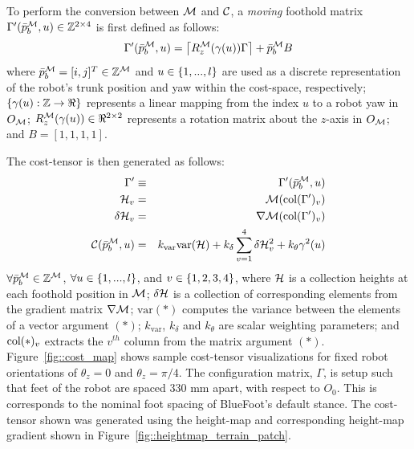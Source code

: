 			To perform the conversion between ${\cal M}$ and ${\cal C}$, a \emph{moving} foothold matrix $\Gamma'(\bar{p}^{{\cal M}}_{b},u) \in {\Bbb Z}^{2\times4}$ is first defined as follows:
				\begin{equation}
					\Gamma'(\bar{p}^{{\cal M}}_{b},u) = \left\lceil R_{z}^{{\cal M}}(\gamma(u))\Gamma \right\rceil + \bar{p}^{{\cal M}}_{b} B \\
					\label{eq::rel_feet}
				\end{equation}
			where  $\bar{p}^{{\cal M}}_{b} = [i,j]^T\in{\Bbb Z}^{{\cal M}}$ and $u \in \left\{1,...,l\right\}$ are used as a discrete representation of the robot's trunk position and yaw within the cost-space, respectively; $\left\{\gamma(u) : {\Bbb Z} \rightarrow \Re \right\}$ represents a linear mapping from the index $u$ to a robot yaw in $O_{{\cal M}}$; $R_{z}^{{\cal M}}(\gamma(u))\in\Re^{2\times2}$ represents a rotation matrix about the $z$-axis in $O_{{\cal M}}$; and $B = [1,1,1,1]$. 

			The cost-tensor is then generated as follows:
				\begin{eqnarray}
					\Gamma'	 				&\equiv& \Gamma'(\bar{p}^{{\cal M}}_{b},u) \nonumber \\
					{\cal H}_{v} 			&=& {\cal M}(\text{col}(\Gamma')_{v})	 \nonumber\\
					\delta {\cal H}_{v} 	&=& \nabla {\cal M}(\text{col}(\Gamma')_{v}) \nonumber\\
					{\cal C}(\bar{p}^{{\cal M}}_{b},u) 		&=& k_{\text{var}} \text{var}({\cal H}) + k_{\delta}\sum_{v=1}^{4} \delta {\cal H}_{v}^{2} + k_{\theta} \gamma^{2}(u) 
				\end{eqnarray}
			$\forall \bar{p}^{{\cal M}}_{b} \in \mathbb{Z}^{{\cal M}}$, $\forall u \in \left\{1,...,l\right\}$, and  $v \in \left\{1,2,3,4\right\}$, where ${\cal H}$ is a collection heights at each foothold position in ${\cal M}$; $\delta{\cal H}$ is a collection of corresponding elements from the gradient matrix $\nabla {\cal M}$; $\text{var}(*)$ computes the variance between the elements of a vector argument $(*)$; $k_{\text{var}}$, $k_{\delta}$ and $k_{\theta}$ are scalar weighting parameters; and $\text{col}(*)_{v}$ extracts the $v^{th}$ column from the matrix argument $(*)$. Figure~\ref{fig::cost_map} shows sample cost-tensor visualizations for fixed robot orientations of $\theta_{z}=0$ and $\theta_{z}=\pi/4$. The configuration matrix, $\Gamma$, is setup such that feet of the robot are spaced $330\text{ mm}$ apart, with respect to $O_{0}$. This is corresponds to the nominal foot spacing of BlueFoot's default stance. The cost-tensor shown was generated using the height-map and corresponding height-map gradient shown in Figure~\ref{fig::heightmap_terrain_patch}.

